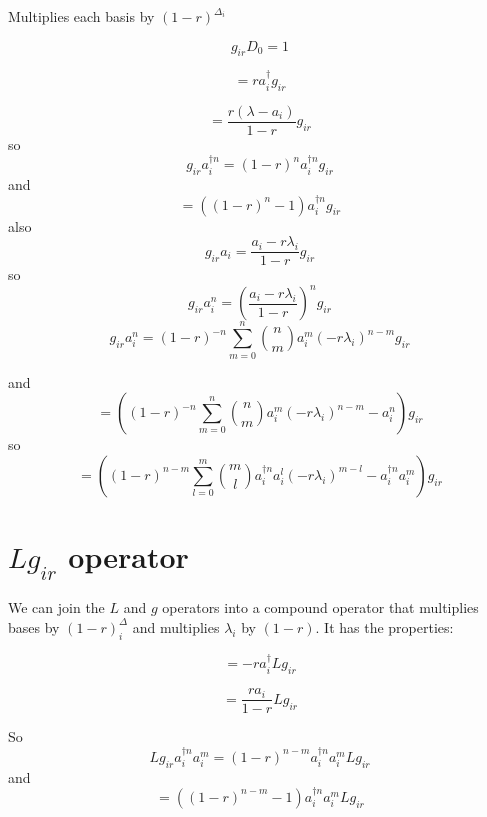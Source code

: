 \documentclass[letterpaper,10pt]{article}
\begin{document}
Multiplies each basis by $(1-r)^{\Delta_i}$

\[
g_{ir}D_0 = 1
\]

\begin{equation}
[a_i^\dag, g_{ir}] = ra_i^\dag g_{ir}
\end{equation}

\begin{equation}
[a_i, g_{ir}] = \frac{r(\lambda - a_i)}{1-r}g_{ir}
\end{equation}
so
\begin{equation}
g_{ir}a_i^{\dag n} = (1-r)^na_i^{\dag n}g_{ir}
\end{equation}
and
\begin{equation}
[g_{ir}, a_i^{\dag n}] = ((1-r)^n - 1)a_i^{\dag n}g_{ir}
\end{equation}
also
\begin{equation}
g_{ir}a_i = \frac{a_i-r\lambda_i}{1-r}g_{ir}
\end{equation}
so
\begin{equation}
g_{ir}a_i^n = \left(\frac{a_i-r\lambda_i}{1-r}\right)^ng_{ir}
\end{equation}
\begin{equation}
g_{ir}a_i^n = (1-r)^{-n}\sum_{m=0}^n{n \choose m} a_i^m(-r\lambda_i)^{n-m}g_{ir}
\end{equation}

and
\begin{equation}
[g_{ir},a_i^n] = \left((1-r)^{-n}\sum_{m=0}^n{n \choose m} a_i^m(-r\lambda_i)^{n-m} - a_i^n\right) g_{ir}
\end{equation}
so
\begin{equation}
[g_{ir},a_i^{\dag n}a_i^m] = \left((1-r)^{n-m}\sum_{l=0}^m{m \choose l} a_i^{\dag n}a_i^l(-r\lambda_i)^{m-l} - a_i^{\dag n}a_i^m\right) g_{ir}
\end{equation}

\section{$Lg_{ir}$ operator}

We can join the $L$ and $g$ operators into a compound operator that multiplies bases by $(1-r)^\Delta_i$ and multiplies $\lambda_i$ by $(1-r)$. It has the properties:

\begin{equation}
[Lg_{ir}, a_i^\dag] = -ra_i^\dag Lg_{ir}
\end{equation}


\begin{equation}
[Lg_{ir}, a_i] = \frac{ra_i}{1-r} Lg_{ir}
\end{equation}

So
\begin{equation}
Lg_{ir}a_i^{\dag n}a_i^m = (1-r)^{n-m}a_i^{\dag n}a_i^mLg_{ir}
\end{equation}
and
\begin{equation}
[Lg_{ir},a_i^{\dag n}a_i^m] = ((1-r)^{n-m} - 1)a_i^{\dag n}a_i^mLg_{ir}
\end{equation}





\end{document}
